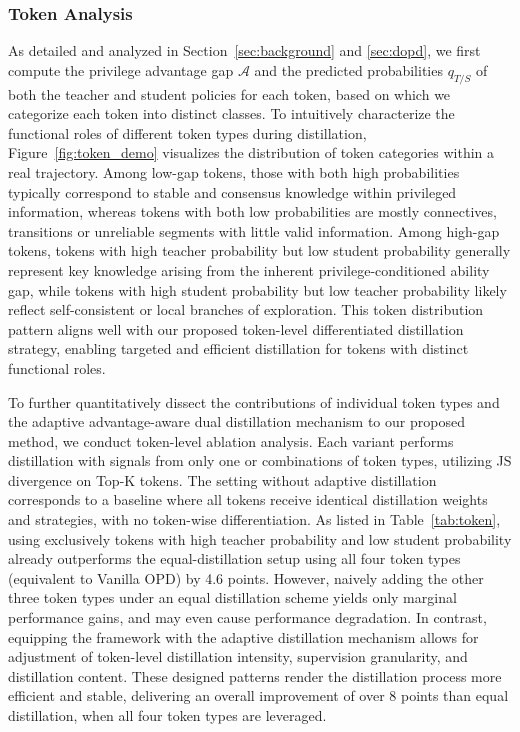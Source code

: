 \documentclass{llmxive}
\begin{document}
\subsubsection{Token Analysis}
As detailed and analyzed in Section~\ref{sec:background} and \ref{sec:dopd}, we first compute the privilege advantage gap $\mathcal{A}$ and the predicted probabilities $q_{T/S}$ of both the teacher and student policies for each token, based on which we categorize each token into distinct classes.
To intuitively characterize the functional roles of different token types during distillation, Figure~\ref{fig:token_demo} visualizes the distribution of token categories within a real trajectory.
Among low-gap tokens, those with both high probabilities typically correspond to stable and consensus knowledge within privileged information, whereas tokens with both low probabilities are mostly connectives, transitions or unreliable segments with little valid information.
Among high-gap tokens, tokens with high teacher probability but low student probability generally represent key knowledge arising from the inherent privilege-conditioned ability gap, while tokens with high student probability but low teacher probability likely reflect self-consistent or local branches of exploration.
This token distribution pattern aligns well with our proposed token-level differentiated distillation strategy, enabling targeted and efficient distillation for tokens with distinct functional roles.






To further quantitatively dissect the contributions of individual token types and the adaptive advantage-aware dual distillation mechanism to our proposed method, we conduct token-level ablation analysis.
Each variant performs distillation with signals from only one or combinations of token types, utilizing JS divergence on Top-K tokens. The setting without adaptive distillation corresponds to a baseline where all tokens receive identical distillation weights and strategies, with no token-wise differentiation.
As listed in Table~\ref{tab:token}, using exclusively tokens with high teacher probability and low student probability already outperforms the equal-distillation setup using all four token types (equivalent to Vanilla OPD) by 4.6 points.
However, naively adding the other three token types under an equal distillation scheme yields only marginal performance gains, and may even cause performance degradation.
In contrast, equipping the framework with the adaptive distillation mechanism allows for adjustment of token-level distillation intensity, supervision granularity, and distillation content. These designed patterns render the distillation process more efficient and stable, delivering an overall improvement of over 8 points than equal distillation, when all four token types are leveraged.
\end{document}
